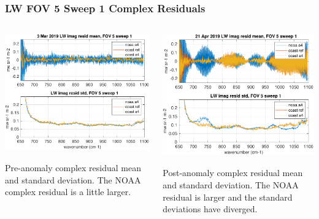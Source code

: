 \documentclass[10pt]{beamer}
\begin{document}
\begin{frame}
\frametitle{LW FOV 5 Sweep 1 Complex Residuals}
\begin{columns}[t]
\begin{column}{0.5\textwidth}
  \begin{centering}
  \includegraphics[width=\textwidth]{figures/LW_MW_good_imag_fov5_sd1.pdf}
  \end{centering}\vspace{3mm}
  Pre-anomaly complex residual mean and standard deviation.  The NOAA complex
  residual is a little larger.

\end{column}
\begin{column}{0.5\textwidth}  
  \begin{centering}
  \includegraphics[width=\textwidth]{figures/LW_MW_fail_imag_fov5_sd1.pdf}
  \end{centering}\vspace{3mm}
  Post-anomaly complex residual mean and standard deviation.  The
  NOAA residual is larger and the standard deviations have diverged.

\end{column}
\end{columns}
\end{frame}
\end{document}
